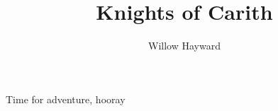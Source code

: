 \documentclass[letterpaper,twocolumn,openany]{rpgarticle}
\title{Knights of Carith}
\author{Willow Hayward}
\begin{document}
Time for adventure, hooray
\end{document}
